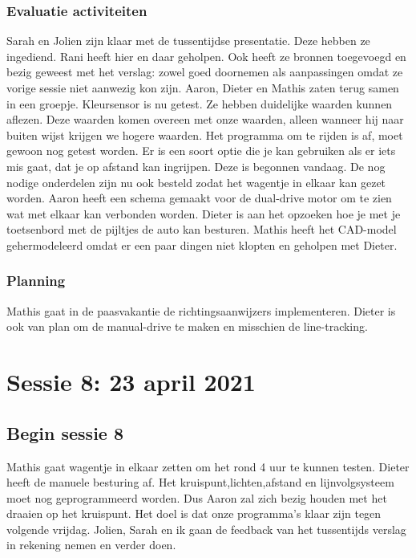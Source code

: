 \documentclass[a4paper,twoside,kulak]{kulakreport} %
\begin{document}
\subsection{Evaluatie activiteiten}
Sarah en Jolien zijn klaar met de tussentijdse presentatie. Deze hebben ze ingediend. Rani heeft hier en daar geholpen. Ook heeft ze bronnen toegevoegd en bezig geweest met het verslag: zowel goed doornemen als aanpassingen omdat ze vorige sessie niet aanwezig kon zijn. Aaron, Dieter en Mathis zaten terug samen in een groepje. Kleursensor is nu getest. Ze hebben duidelijke waarden kunnen aflezen. Deze waarden komen overeen met onze waarden, alleen wanneer hij naar buiten wijst krijgen we hogere waarden. Het programma om te rijden is af, moet gewoon nog getest worden. Er is een soort optie die je kan gebruiken als er iets mis gaat, dat je op afstand kan ingrijpen. Deze is begonnen vandaag. De nog nodige onderdelen zijn nu ook besteld zodat het wagentje in elkaar kan gezet worden. Aaron heeft een schema gemaakt voor de dual-drive motor om te zien wat met elkaar kan verbonden worden. Dieter is aan het opzoeken hoe je met je toetsenbord met de pijltjes de auto kan besturen. Mathis heeft het CAD-model gehermodeleerd omdat er een paar dingen niet klopten en geholpen met Dieter. 

\subsection{Planning}
Mathis gaat in de paasvakantie de richtingsaanwijzers implementeren. Dieter is ook van plan om de manual-drive te maken en misschien de line-tracking. 

\chapter{Sessie 8: 23 april 2021}
\section{Begin sessie 8}
Mathis gaat wagentje in elkaar zetten om het rond 4 uur te kunnen testen. Dieter heeft de manuele besturing af. Het kruispunt,lichten,afstand en lijnvolgsysteem moet nog geprogrammeerd worden. Dus Aaron zal zich bezig houden met het draaien op het kruispunt. Het doel is dat onze programma's klaar zijn tegen volgende vrijdag. Jolien, Sarah en ik gaan de feedback van het tussentijds verslag in rekening nemen en verder doen.
\end{document}
